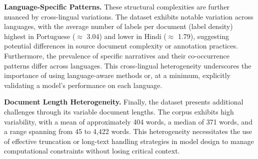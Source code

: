 \textbf{Language-Specific Patterns.} These structural complexities are further nuanced by cross-lingual variations. The dataset exhibits notable variation across languages, with the average number of labels per document (label density) highest in Portuguese (\(\approx\) 3.04) and lower in Hindi (\(\approx\) 1.79), suggesting potential differences in source document complexity or annotation practices. Furthermore, the prevalence of specific narratives and their co-occurrence patterns differ across languages. This cross-lingual heterogeneity underscores the importance of using language-aware methods or, at a minimum, explicitly validating a model's performance on each language.

\textbf{Document Length Heterogeneity.} Finally, the dataset presents additional challenges through its variable document lengths. The corpus exhibits high variability, with a mean of approximately 404 words, a median of 371 words, and a range spanning from 45 to 4,422 words. This heterogeneity necessitates the use of effective truncation or long-text handling strategies in model design to manage computational constraints without losing critical context.
